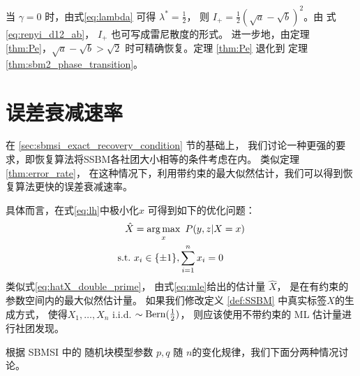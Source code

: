 \begin{remark}
当 $\gamma=0$ 时，由式\eqref{eq:lambda} 可得 $\lambda^*=\frac{1}{2}$，
则 $I_+=\frac{1}{2}\left(\sqrt{a} - \sqrt{b}\right)^2$。由 式 \eqref{eq:renyi_d12_ab}，
$I_+$ 也可写成雷尼散度的形式。
进一步地，由定理 \ref{thm:Pe}，$\sqrt{a}-\sqrt{b} > \sqrt{2}$
时可精确恢复。定理 \ref{thm:Pe} 退化到
定理 \ref{thm:sbm2_phase_transition}。
\end{remark}

\section{误差衰减速率}\label{sec:sbmsi_error_decay_rate}
在 \ref{sec:sbmsi_exact_recovery_condition} 节的基础上，
我们讨论一种更强的要求，即恢复算法将SSBM各社团大小相等的条件考虑在内。
类似定理 \ref{thm:error_rate}，
在这种情况下，利用带约束的最大似然估计，我们可以得到恢复算法更快的误差衰减速率。

具体而言，在式\eqref{eq:lh}中极小化$x$
可得到如下的优化问题：
\begin{align}
    \hat{X} &= \operatorname*{arg\,max}_x\ P(y,z|X=x) \notag \\
    \textrm{s.t.} \ & x_i \in \{\pm 1\}, \sum_{i=1}^n x_i=0 \label{eq:mle}
\end{align}
类似式\eqref{eq:hatX_double_prime}，
由式\eqref{eq:mle}给出的估计量 $\hat{X}$，
是在有约束的参数空间内的最大似然估计量。
如果我们修改定义 \ref{def:SSBM} 中真实标签$X$的生成方式，
使得$X_1, \dots, X_n$ i.i.d. $\sim \operatorname{Bern}(\frac{1}{2})$，
则应该使用不带约束的 ML 估计量进行社团发现。

根据 SBMSI 中的 随机块模型参数 $p,q$ 随 $n$的变化规律，我们下面分两种情况讨论。
